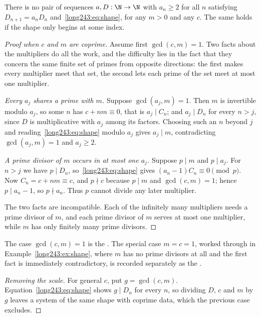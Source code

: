 \documentclass[11pt]{article}
\begin{document}
\begin{theorem}\label{long243:res:constant}
There is no pair of sequences $a,D:\N\to\N$ with $a_n\ge2$ for all $n$
satisfying $D_{n+1}=a_nD_n$ and~\eqref{long243:eq:shape}, for any $m>0$ and any
$c$.  The same holds if the shape only begins at some index.
\end{theorem}

\begin{proof}[Proof when $c$ and $m$ are coprime]
Assume first $\gcd(c,m)=1$.  Two facts about the multipliers do all the work,
and the difficulty lies in the fact that they concern the same finite set of
primes from opposite directions: the first makes every multiplier meet that
set, the second lets each prime of the set meet at most one multiplier.

\emph{Every $a_j$ shares a prime with $m$.}  Suppose $\gcd(a_j,m)=1$.  Then
$m$ is invertible modulo $a_j$, so some $n$ has $c+nm\equiv0$, that is
$a_j\mid C_n$; and $a_j\mid D_n$ for every $n>j$, since $D$ is multiplicative
with $a_j$ among its factors.  Choosing such an $n$ beyond $j$
and reading~\eqref{long243:eq:shape} modulo $a_j$ gives $a_j\mid m$, contradicting
$\gcd(a_j,m)=1$ and $a_j\ge2$.

\emph{A prime divisor of $m$ occurs in at most one $a_j$.}  Suppose $p\mid m$
and $p\mid a_j$.  For $n>j$ we have $p\mid D_n$, so~\eqref{long243:eq:shape} gives
$(a_n-1)C_n\equiv0 \pmod p$.  Now $C_n=c+nm\equiv c$, and $p\nmid c$ because
$p\mid m$ and $\gcd(c,m)=1$; hence $p\mid a_n-1$, so $p\nmid a_n$.  Thus $p$
cannot divide any later multiplier.

The two facts are incompatible.  Each of the infinitely many multipliers needs
a prime divisor of $m$, and each prime divisor of $m$ serves at most one
multiplier, while $m$ has only finitely many prime divisors.
\end{proof}

\noindent The case $\gcd(c,m)=1$ is the
.  The special case $m=c=1$, worked through in
Example~\ref{long243:ex:shape}, where $m$ has no prime divisors at all and the first
fact is immediately contradictory, is recorded separately as the
.

\begin{proof}[Removing the scale]
For general $c$, put $g=\gcd(c,m)$.  Equation~\eqref{long243:eq:shape} shows
$g\mid D_n$ for every $n$, so dividing $D$, $c$ and $m$ by $g$ leaves a system
of the same shape with coprime data, which the previous case excludes.
\end{proof}
\end{document}
